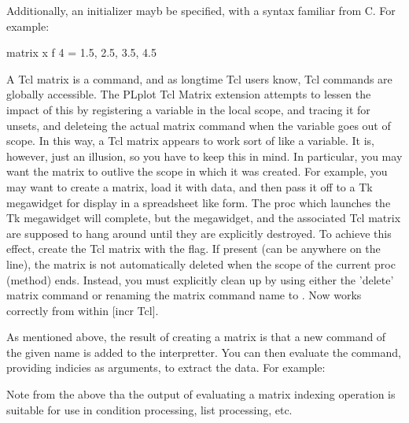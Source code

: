 Additionally, an initializer mayb be specified, with a syntax familiar
from C.  For example:
\begin{example}
matrix x f 4 = { 1.5, 2.5, 3.5, 4.5 }
\end{example}

A Tcl matrix is a command, and as longtime Tcl users know, Tcl
commands are globally accessible.  The PLplot Tcl Matrix extension
attempts to lessen the impact of this by registering a variable in the
local scope, and tracing it for unsets, and deleteing the actual
matrix command when the variable goes out of scope.  In this way, a
Tcl matrix appears to work sort of like a variable.  It is, however,
just an illusion, so you have to keep this in mind.  In particular,
you may want the matrix to outlive the scope in which it was created.
For example, you may want to create a matrix, load it with data, and
then pass it off to a Tk megawidget for display in a spreadsheet like
form.  The proc which launches the Tk megawidget will complete, but
the megawidget, and the associated Tcl matrix are supposed to hang
around until they are explicitly destroyed.  To achieve this effect,
create the Tcl matrix with the  flag.  If present
(can be anywhere on the line), the matrix is not automatically deleted
when the scope of the current proc (method) ends.  Instead, you must
explicitly clean up by using either the 'delete' matrix command or renaming
the matrix command name to {}.  Now works correctly from within [incr Tcl].

As mentioned above, the result of creating a matrix is that a new
command of the given name is added to the interpretter.  You can then
evaluate the command, providing indicies as arguments, to extract the
data.  For example:
Note from the above tha the output of evaluating a matrix indexing
operation is suitable for use in condition processing, list
processing, etc.

